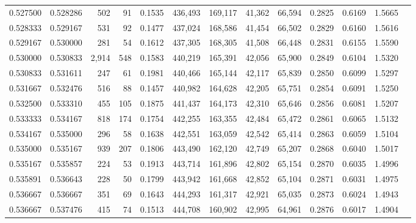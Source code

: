 \begin{tabular}{rrrrrrrrrrrrr}
0.527500 & 0.528286 &   502 &  91 &                                     0.1535 & 436,493 & 169,117 &  41,362 &  66,594 & 0.2825 & 0.6169 & 1.5665 \\
0.528333 & 0.529167 &   531 &  92 &                                     0.1477 & 437,024 & 168,586 &  41,454 &  66,502 & 0.2829 & 0.6160 & 1.5616 \\
0.529167 & 0.530000 &   281 &  54 &                                     0.1612 & 437,305 & 168,305 &  41,508 &  66,448 & 0.2831 & 0.6155 & 1.5590 \\
0.530000 & 0.530833 & 2,914 & 548 &                                     0.1583 & 440,219 & 165,391 &  42,056 &  65,900 & 0.2849 & 0.6104 & 1.5320 \\
0.530833 & 0.531611 &   247 &  61 &                                     0.1981 & 440,466 & 165,144 &  42,117 &  65,839 & 0.2850 & 0.6099 & 1.5297 \\
0.531667 & 0.532476 &   516 &  88 &                                     0.1457 & 440,982 & 164,628 &  42,205 &  65,751 & 0.2854 & 0.6091 & 1.5250 \\
0.532500 & 0.533310 &   455 & 105 &                                     0.1875 & 441,437 & 164,173 &  42,310 &  65,646 & 0.2856 & 0.6081 & 1.5207 \\
0.533333 & 0.534167 &   818 & 174 &                                     0.1754 & 442,255 & 163,355 &  42,484 &  65,472 & 0.2861 & 0.6065 & 1.5132 \\
0.534167 & 0.535000 &   296 &  58 &                                     0.1638 & 442,551 & 163,059 &  42,542 &  65,414 & 0.2863 & 0.6059 & 1.5104 \\
0.535000 & 0.535167 &   939 & 207 &                                     0.1806 & 443,490 & 162,120 &  42,749 &  65,207 & 0.2868 & 0.6040 & 1.5017 \\
0.535167 & 0.535857 &   224 &  53 &                                     0.1913 & 443,714 & 161,896 &  42,802 &  65,154 & 0.2870 & 0.6035 & 1.4996 \\
0.535891 & 0.536643 &   228 &  50 &                                     0.1799 & 443,942 & 161,668 &  42,852 &  65,104 & 0.2871 & 0.6031 & 1.4975 \\
0.536667 & 0.536667 &   351 &  69 &                                     0.1643 & 444,293 & 161,317 &  42,921 &  65,035 & 0.2873 & 0.6024 & 1.4943 \\
0.536667 & 0.537476 &   415 &  74 &                                     0.1513 & 444,708 & 160,902 &  42,995 &  64,961 & 0.2876 & 0.6017 & 1.4904 \\

\end{tabular}

